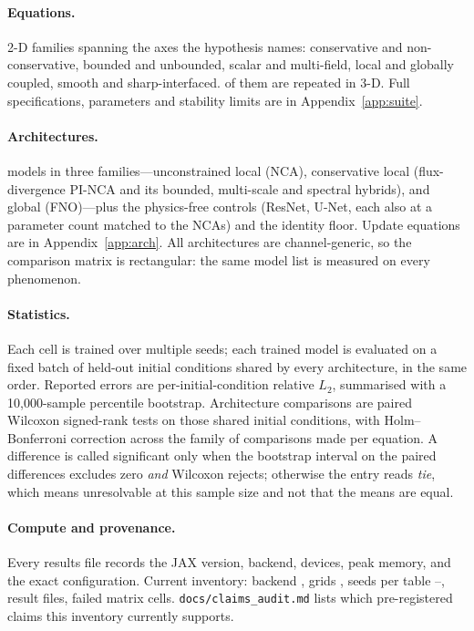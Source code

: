 \documentclass{article}
\newcommand{\code}[1]{\texttt{\small #1}}
\begin{document}
\paragraph{Equations.} \NpdesTwoD{} 2-D families spanning the axes the hypothesis names:
conservative and non-conservative, bounded and unbounded, scalar and multi-field, local
and globally coupled, smooth and sharp-interfaced. \NpdesThreeD{} of them are repeated in
3-D. Full specifications, parameters and stability limits are in
Appendix~\ref{app:suite}.

\paragraph{Architectures.} \Narchs{} models in three families---unconstrained local
(NCA), conservative local (flux-divergence PI-NCA and its bounded, multi-scale and
spectral hybrids), and global (FNO)---plus the physics-free controls (ResNet, U-Net, each
also at a parameter count matched to the NCAs) and the identity floor. Update equations
are in Appendix~\ref{app:arch}. All architectures are channel-generic, so the comparison
matrix is rectangular: the same model list is measured on every phenomenon.

\paragraph{Statistics.} Each cell is trained over multiple seeds; each trained model is
evaluated on a fixed batch of held-out initial conditions shared by every architecture, in
the same order. Reported errors are per-initial-condition relative $L_2$, summarised with
a 10{,}000-sample percentile bootstrap. Architecture comparisons are paired Wilcoxon
signed-rank tests on those shared initial conditions, with Holm--Bonferroni correction
across the family of comparisons made per equation. A difference is called significant
only when the bootstrap interval on the paired differences excludes zero \emph{and}
Wilcoxon rejects; otherwise the entry reads \emph{tie}, which means unresolvable at this
sample size and not that the means are equal.

\paragraph{Compute and provenance.} Every results file records the JAX version, backend,
devices, peak memory, and the exact configuration. Current inventory: backend
\Backends{}, grids \Grids{}, seeds per table \MinSeeds--\MaxSeeds{},
\Nresultfiles{} result files, \Nfailedcells{} failed matrix cells.
\code{docs/claims\_audit.md} lists which pre-registered claims this inventory currently
supports.
\end{document}

